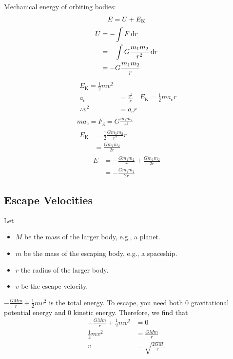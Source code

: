 Mechanical energy of orbiting bodies:
\begin{gather}
    E = U + E_\mathrm{K} \\
    \begin{aligned}
        U &= - \int F \odif{r} \\
        &= - \int G \frac{m_1 m_2}{r^2} \odif{r} \\
        &= -G \frac{m_1 m_2}{r}
    \end{aligned}
\end{gather}
\begin{gather}
    \begin{aligned}
        E_\mathrm{K} = \frac{1}{2} m v^2 \nonumber \\
        a_\mathrm{c} &= \frac{v^2}{r} \\
        \therefore v^2 &= a_\mathrm{c} r
    \end{aligned}
    E_\mathrm{K} = \frac{1}{2} m a_\mathrm{c} r \\
    m a_\mathrm{c} = F_\mathrm{g} = G \frac{m_1 m_2}{r^2} \\
    \begin{aligned}
        E_\mathrm{K} &= \frac{1}{2} \frac{G m_1 m_2}{r^2} r \\
        &= \frac{G m_1 m_2}{2 r}
    \end{aligned}
\end{gather}
\begin{equation}
    \begin{aligned}
        E &= - \frac{G m_1 m_2}{r} + \frac{G m_1 m_2}{2 r} \\
        &= - \frac{G m_1 m_2}{2 r}
    \end{aligned}
\end{equation}

\subsection{Escape Velocities}

Let
\begin{itemize}
    \item \(M\) be the mass of the larger body, e.g., a planet.
    \item \(m\) be the mass of the escaping body, e.g., a spaceship.
    \item \(r\) the radius of the larger body.
    \item \(v\) be the escape velocity.
\end{itemize}
\(- \frac{G M m}{r} + \frac{1}{2} m v^2\) is the total energy.
To escape, you need both 0 gravitational potential energy and 0 kinetic energy.
Therefore, we find that
\begin{equation}
    \begin{aligned}
        - \frac{G M m}{r} + \frac{1}{2} m v^2 &= 0 \\
        \frac{1}{2} m v^2 &= \frac{G M m}{r} \\
        v &= \sqrt{\frac{2 G M}{r}}.
    \end{aligned}
\end{equation}
